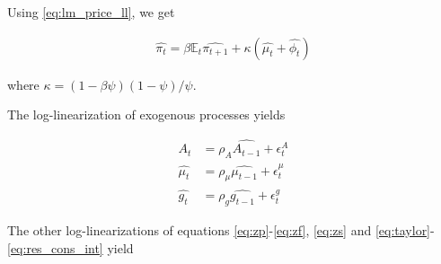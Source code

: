 Using \eqref{eq:lm_price_ll}, we get

\begin{align}
\widehat{\pi_t} = \beta \mathbb{E}_t \widehat{\pi_{t+1}} + \kappa \left( \widehat{\mu_t} + \widehat{\phi_t} \right)
\end{align}

where $\kappa = (1-\beta \psi) (1-\psi) / \psi$.

The log-linearization of exogenous processes yields

\begin{align*}
\widehat{A_t} &= \rho_A \widehat{A_{t-1}} + \epsilon_t^A\\
\widehat{\mu_t} &= \rho_\mu \widehat{\mu_{t-1}} + \epsilon_t^\mu\\
\widehat{g_t} &= \rho_g \widehat{g_{t-1}} + \epsilon_t^g
\end{align*}

The other log-linearizations of equations \eqref{eq:zp}-\eqref{eq:zf}, \eqref{eq:zs} and \eqref{eq:taylor}-\eqref{eq:res_cons_int} yield


